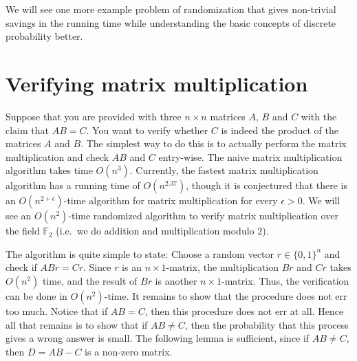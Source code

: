 We will see one more example problem of randomization that gives non-trivial
savings in the running time while understanding the basic concepts of discrete
probability better.

\section{Verifying matrix multiplication}

Suppose that you are provided with three $n\times n$ matrices $A$, $B$ and $C$
with the claim that $AB = C$. You want to verify whether $C$ is indeed the
product of the matrices $A$ and $B$. The simplest way to do this is to actually
perform the matrix multiplication and check $AB$ and $C$ entry-wise. The naive
matrix multiplication algorithm takes time $O(n^3)$. Currently, the fastest
matrix multiplication algorithm has a running time of $O(n^{2.37})$, though it
is conjectured that there is an $O(n^{2+\epsilon})$-time algorithm for matrix
multiplication for every $\epsilon > 0$. We will see an $O(n^2)$-time randomized
algorithm to verify matrix multiplication over the field $\mathbb{F}_2$ (i.e.\
we do addition and multiplication modulo $2$).

The algorithm is quite simple to state: Choose a random vector $r \in \{0,1\}^n$
and check if $ABr = Cr$. Since $r$ is an $n\times 1$-matrix, the multiplication
$Br$ and $Cr$ takes $O(n^2)$ time, and the result of $Br$ is another
$n\times 1$-matrix. Thus, the verification can be done in $O(n^2)$-time. It
remains to show that the procedure does not err too much. Notice that if $AB=C$,
then this procedure does not err at all. Hence all that remains is to show that
if $AB\neq C$, then the probability that this process gives a wrong answer is
small. The following lemma is sufficient, since if $AB \neq C$, then $D=AB-C$ is
a non-zero matrix.

